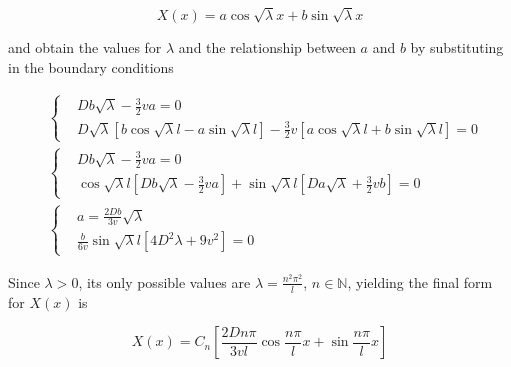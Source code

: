 \documentclass[a4paper, 10pt]{article}
\begin{document}
  \begin{equation}
    X(x) = a \cos \sqrt{\lambda} x + b \sin \sqrt{\lambda} x 
  \end{equation}

  and obtain the values for $\lambda$ and the relationship between $a$ and
  $b$ by substituting in the boundary conditions

  \begin{align}
    &\left\{\begin{aligned}
      &D b \sqrt{\lambda} - \frac{3}{2}v a = 0\\
      &D\sqrt{\lambda} \left[b \cos \sqrt{\lambda} l - a \sin \sqrt{\lambda}
      l\right] - \frac{3}{2}v \left[a\cos \sqrt{\lambda} l + b \sin
      \sqrt{\lambda}l\right] = 0
    \end{aligned}\right.\\[6pt]
    &\left\{\begin{aligned}
      &D b \sqrt{\lambda} - \frac{3}{2}v a = 0\\
      &\cos\sqrt{\lambda}l \left[Db\sqrt{\lambda} - \frac{3}{2}va\right] + \sin
      \sqrt{\lambda}l \left[Da\sqrt{\lambda} + \frac{3}{2}v b \right] = 0
    \end{aligned}\right.\\[10pt]
    &\left\{\begin{aligned}
      & a = \frac{2 D b}{3v} \sqrt{\lambda}\\
      &\frac{b}{6v} \sin \sqrt{\lambda} l \left[4D^2 \lambda + 9 v^2\right] = 0
    \end{aligned}\right.
  \end{align}

  Since $\lambda > 0$, its only possible values are $\lambda = \frac{n^2
  \pi^2}{l}$, $n \in \mathbb{N}$, yielding the final form for $X(x)$ is

  \begin{equation}
    X(x) = C_n \left[\frac{2 D n \pi}{3vl} \cos \frac{n \pi}{l}x + \sin \frac{n
    \pi}{l}x\right]
  \end{equation}



  \printbibliography
\end{document}
